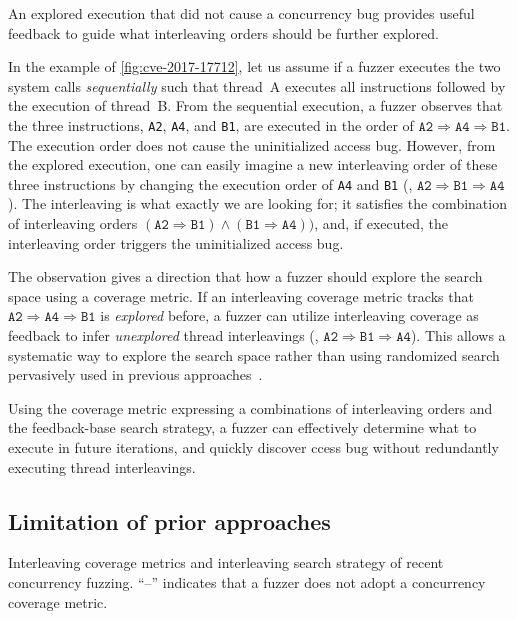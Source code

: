 %
An explored execution that did not cause a concurrency bug provides useful feedback 
to guide what interleaving orders should be further explored.

In the example of \autoref{fig:cve-2017-17712}, let us assume 
if a fuzzer executes the two system calls \textit{sequentially} 
such that thread~A executes all instructions followed by the execution of thread~B.
From the sequential execution, a fuzzer observes that the three instructions,
\texttt{A2}, \texttt{A4}, and \texttt{B1}, are  executed in the order of
$\texttt{A2} \Rightarrow \texttt{A4} \Rightarrow \texttt{B1}$. 
The execution order does not cause the uninitialized access bug.
%
However, from the explored execution, one can easily imagine a new interleaving order of these three
instructions by changing the execution order of \texttt{A4} and
\texttt{B1} (\ie,
$\texttt{A2} \Rightarrow \texttt{B1} \Rightarrow \texttt{A4}$).
%
The  interleaving is what exactly we are looking for; it
satisfies the combination of interleaving orders
$(\texttt{A2} \Rightarrow \texttt{B1}) \wedge (\texttt{B1} \Rightarrow
\texttt{A4}))$, and, if executed, the interleaving order triggers 
the uninitialized access bug.

The observation gives a direction that how a fuzzer should explore 
the search space using a coverage metric.
If an interleaving coverage metric tracks that
$\texttt{A2} \Rightarrow \texttt{A4} \Rightarrow \texttt{B1}$ is
\textit{explored} before, a fuzzer can utilize interleaving
coverage as feedback to infer \textit{unexplored} thread interleavings (\eg,
$\texttt{A2} \Rightarrow \texttt{B1} \Rightarrow \texttt{A4}$). 
This allows a systematic way to explore the search space rather than 
using randomized search pervasively used in previous approaches~.

Using the coverage metric expressing a combinations of interleaving orders and the feedback-base search strategy, a fuzzer can effectively determine what to execute in future iterations, and quickly discover 
ccess bug
without redundantly executing thread interleavings.



\subsection{Limitation of prior approaches}
\label{ss:existingapproaches}
\begin{table}[t]
  \centering
  
  \caption{Interleaving coverage metrics and interleaving search
    strategy of recent concurrency fuzzing. ``--'' indicates that a
    fuzzer does not adopt a concurrency coverage metric. }
  \label{table:motivation}
\end{table}


